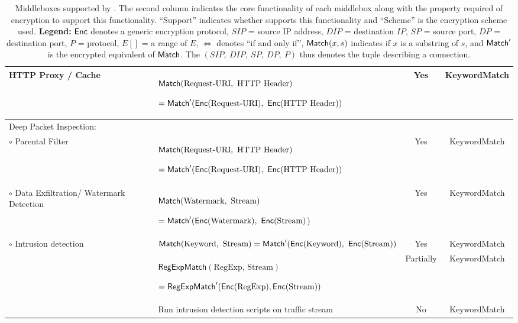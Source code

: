 \begin{table*}[t]
{\begin{tabular}{|>{\raggedright}p{3cm}|>{\raggedright}p{8.7cm}|c|c|}
HTTP Proxy / Cache~\cite{rfc3040, haproxy, squid} &
$ \mathsf{Match}(\text{Request-URI},\ \text{HTTP Header})$

$= \Match'(\Enc(\text{Request-URI}),\ \Enc(\text{HTTP Header})) $
& Yes & KeywordMatch \\ \hline

Deep Packet Inspection: & & & \\


$\circ$ Parental Filter~\cite{squid} &
$ \mathsf{Match}(\text{Request-URI},\ \text{HTTP Header})$

$ = \Match'(\Enc(\text{Request-URI}),\ \Enc(\text{HTTP Header})) $
 &
Yes & KeywordMatch \\
%
%
$\circ$ Data Exfiltration/  Watermark Detection 
&
$\Match(\text{Watermark},\ \text{Stream})  \hspace{1mm}$ 

$ = \Match'(\Enc(\text{Watermark}),\ \Enc(\text{Stream})$)
 &
Yes & KeywordMatch \\ 
%
%
$\circ$ Intrusion detection~\cite{snort, bro}
&
$ \mathsf{Match}(\text{Keyword},\ \text{Stream}) =   \mathsf{Match}'(\mathsf{Enc}(\text{Keyword}),\ \mathsf{Enc}(\text{Stream}))$
&
Yes & KeywordMatch \\ 
%
%
&
$\mathsf{RegExpMatch}(\text{RegExp, Stream})$

$ = \mathsf{RegExpMatch}'(\mathsf{Enc}(\text{RegExp}),\mathsf{Enc}(\text{Stream}))$
&
Partially & KeywordMatch \\

&
Run intrusion detection scripts on traffic stream
 &
No & KeywordMatch \\



 \hline

\end{tabular}
}

\caption[]{Middleboxes supported by \sys. The second column indicates the core functionality of each middlebox along with the property required of encryption to support this functionality. ``Support'' indicates whether \sys supports this functionality and ``Scheme'' is the encryption scheme used.  {\bf Legend:} $\mathsf{Enc}$ denotes a generic encryption protocol,  $SIP$ = source IP address, $DIP$ = destination $IP$, $SP$ = source port, $DP$ = destination port, $P$ = protocol,  $E[]$ = a range of $E$, $\Leftrightarrow$ denotes ``if and only if'', $\mathsf{Match}(x, s)$ indicates if $x$ is a substring of $s$, and $\mathsf{Match}'$ is the encrypted equivalent of $\mathsf{Match}$. The $(SIP,\ DIP,\ SP,\ DP,\ P)$ thus denotes the tuple describing a connection. \label{tbl:mbreqs}} 
\end{table*}

